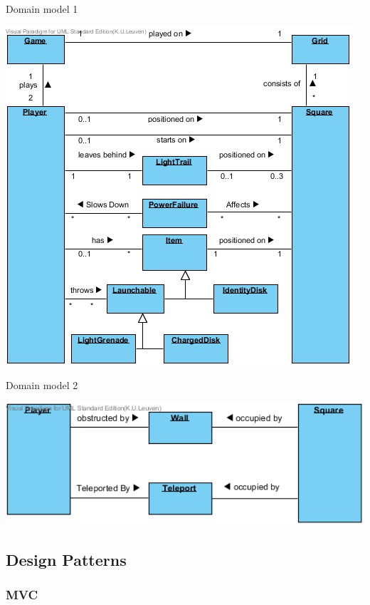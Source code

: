 \documentclass[t]{beamer}
\begin{document}
\begin{frame}{Domain model 1}
\begin{center}
\includegraphics[scale=0.45]{images/DomainModel1}
\end{center}
\end{frame}

\begin{frame}{Domain model 2}
\begin{center}
\vspace{0.5in}
\includegraphics[scale=0.5]{images/DomainModel2}
\end{center}
\end{frame}

\subsection{Design Patterns}



\subsubsection{MVC}
\end{document}

